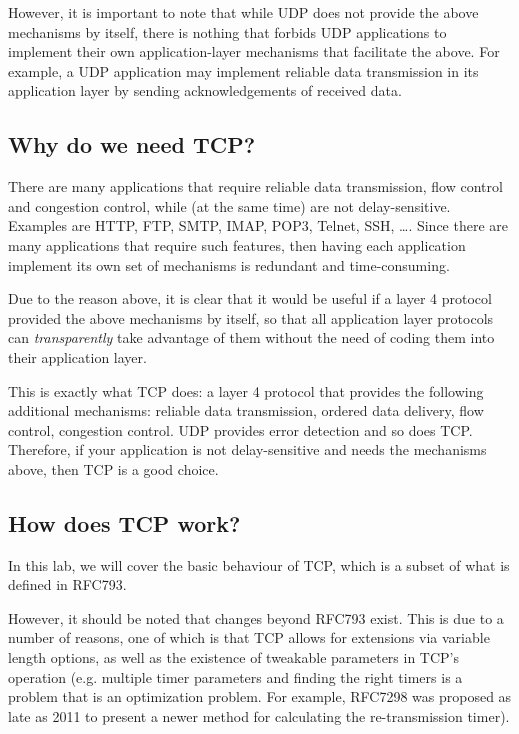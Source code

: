 \documentclass[pdftex,12pt,a4paper]{article}
\begin{document}
            However, it is important to note that while UDP does not provide
            the above mechanisms by itself, there is nothing that forbids UDP
            applications to implement their own application-layer mechanisms
            that facilitate the above. For example, a UDP application may
            implement reliable data transmission in its application layer by
            sending acknowledgements of received data.

        \subsection{Why do we need TCP?}
            There are many applications that require reliable data
            transmission, flow control and congestion control, while (at the
            same time) are not delay-sensitive. Examples are HTTP, FTP, SMTP,
            IMAP, POP3, Telnet, SSH, \ldots. Since there are many applications
            that require such features, then having each application implement
            its own set of mechanisms is redundant and time-consuming.

            Due to the reason above, it is clear that it would be useful if a
            layer 4 protocol provided the above mechanisms by itself, so that
            all application layer protocols can \emph{transparently} take
            advantage of them without the need of coding them into their
            application layer.

            This is exactly what TCP does: a layer 4 protocol that provides the
            following additional mechanisms: reliable data transmission,
            ordered data delivery, flow control, congestion control. UDP
            provides error detection and so does TCP. Therefore, if your
            application is not delay-sensitive and needs the mechanisms above,
            then TCP is a good choice.

        \subsection{How does TCP work?}\label{howdoestcpwork}
            In this lab, we will cover the basic behaviour of TCP, which is a
            subset of what is defined in RFC793. 

            However, it should be noted that changes beyond RFC793 exist. This
            is due to a number of reasons, one of which is that TCP allows for
            extensions via variable length options, as well as the existence of
            tweakable parameters in TCP's operation (e.g. multiple timer
            parameters and finding the right timers is a problem that is an
            optimization problem. For example, RFC7298 was proposed as late as
            2011 to present a newer method for calculating the re-transmission
            timer).
\end{document}
